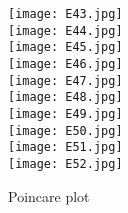 \begin{figure}[!htbp]
%
\centering
\texttt{[image: E43.jpg]}\\
\texttt{[image: E44.jpg]}\\
\texttt{[image: E45.jpg]}\\
\texttt{[image: E46.jpg]}\\
\texttt{[image: E47.jpg]}\\
\subcaption{}
\endminipage\hfill
{}%
\centering
\texttt{[image: E48.jpg]}\\
\texttt{[image: E49.jpg]}\\
\texttt{[image: E50.jpg]}\\
\texttt{[image: E51.jpg]}\\
\texttt{[image: E52.jpg]}\\
\subcaption{}
\endminipage\hfill
\caption{Poincare plot}
\end{figure}




